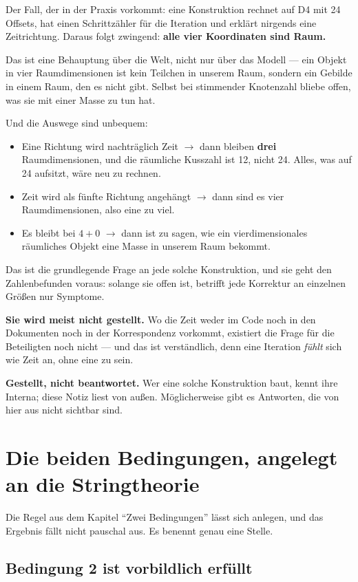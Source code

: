 Der Fall, der in der Praxis vorkommt: eine Konstruktion rechnet auf D4
mit 24 Offsets, hat einen Schrittzähler für die Iteration und erklärt
nirgends eine Zeitrichtung. Daraus folgt zwingend: \textbf{alle vier
Koordinaten sind Raum.}

Das ist eine Behauptung über die Welt, nicht nur über das Modell ---
ein Objekt in vier Raumdimensionen ist kein Teilchen in unserem Raum,
sondern ein Gebilde in einem Raum, den es nicht gibt. Selbst bei
stimmender Knotenzahl bliebe offen, was sie mit einer Masse zu tun hat.

Und die Auswege sind unbequem:
\begin{itemize}
\item Eine Richtung wird nachträglich Zeit $\to$ dann bleiben
  \textbf{drei} Raumdimensionen, und die räumliche Kusszahl ist 12,
  nicht 24. Alles, was auf 24 aufsitzt, wäre neu zu rechnen.
\item Zeit wird als fünfte Richtung angehängt $\to$ dann sind es vier
  Raumdimensionen, also eine zu viel.
\item Es bleibt bei $4+0$ $\to$ dann ist zu sagen, wie ein
  vierdimensionales räumliches Objekt eine Masse in unserem Raum
  bekommt.
\end{itemize}

Das ist die grundlegende Frage an jede solche Konstruktion, und sie
geht den Zahlenbefunden voraus: solange sie offen ist, betrifft jede
Korrektur an einzelnen Größen nur Symptome.

\textbf{Sie wird meist nicht gestellt.} Wo die Zeit weder im Code noch
in den Dokumenten noch in der Korrespondenz vorkommt, existiert die
Frage für die Beteiligten noch nicht --- und das ist verständlich, denn
eine Iteration \emph{fühlt} sich wie Zeit an, ohne eine zu sein.

\textbf{Gestellt, nicht beantwortet.} Wer eine solche Konstruktion
baut, kennt ihre Interna; diese Notiz liest von außen. Möglicherweise
gibt es Antworten, die von hier aus nicht sichtbar sind.

\chapter{Die beiden Bedingungen, angelegt an die Stringtheorie}

Die Regel aus dem Kapitel \enquote{Zwei Bedingungen} lässt sich
anlegen, und das Ergebnis fällt nicht pauschal aus. Es benennt genau
eine Stelle.

\section{Bedingung 2 ist vorbildlich erfüllt}

